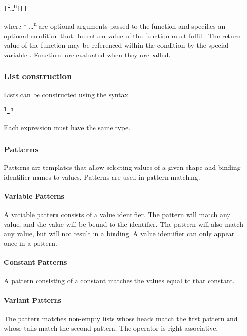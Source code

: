 \begin{alltt}
\quad \term{\midtilde}  [ \textsuperscript{1} \dots {}\textsuperscript{n} ] [ \term{|}  ] 
\end{alltt}

where  \textsuperscript{1} \dots {}\textsuperscript{n}  are optional arguments passed to the function and \term{|}  specifies an optional condition that the return value of the function must fulfill. The return value of the function may be referenced within the condition by the special variable \term{\$}. Functions are evaluated when they are called. 

\subsubsection{List construction}

Lists can be constructed using the syntax
\begin{alltt}
\quad \term{[} \textsuperscript{1} \term{,} \dots \term{,} \textsuperscript{n}  \term{]}
\end{alltt}
Each expression must have the same type. 

\subsubsection{Patterns} 
Patterns are templates that allow selecting values of a given shape and binding identifier names to values. Patterns are used in pattern matching. 

\paragraph{Variable Patterns}
A variable pattern consists of a value identifier. The pattern will match any value, and the value will be bound to the identifier. The pattern \term{\_} will also match any value, but will not result in a binding. A value identifier can only appear once in a pattern.

\paragraph{Constant Patterns}
A pattern consisting of a constant matches the values equal to that constant.

\paragraph{Variant Patterns}
The pattern  \term{::}  matches non-empty lists whose heads match the first pattern and whose tails match the second pattern. The \term{::} operator is right associative.


